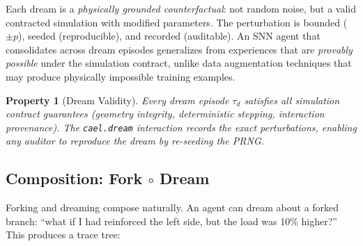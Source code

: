 \documentclass[sigconf,nonacm]{acmart}
\newtheorem{property}{Property}
\begin{document}
Each dream is a \emph{physically grounded counterfactual}: not
random noise, but a valid contracted simulation with modified
parameters. The perturbation is bounded ($\pm p$), seeded
(reproducible), and recorded (auditable). An SNN agent that
consolidates across dream episodes generalizes from experiences
that are \emph{provably possible} under the simulation contract,
unlike data augmentation techniques that may produce physically
impossible training examples.

\begin{property}[Dream Validity]
\label{prop:dream}
Every dream episode $\tau_d$ satisfies all simulation contract
guarantees (geometry integrity, deterministic stepping, interaction
provenance). The \texttt{cael.dream} interaction records the exact
perturbations, enabling any auditor to reproduce the dream by
re-seeding the PRNG.
\end{property}

\subsection{Composition: Fork $\circ$ Dream}

Forking and dreaming compose naturally. An agent can dream about
a forked branch: ``what if I had reinforced the left side, but
the load was 10\% higher?'' This produces a trace tree:

\begin{center}
\end{center}
\end{document}

